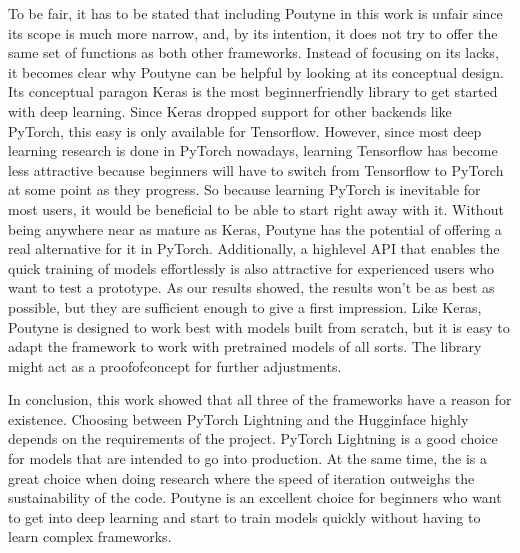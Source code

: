 \documentclass[letterpaper,10pt,english]{jupyterBook}
\begin{document}
\sphinxAtStartPar
To be fair, it has to be stated that including Poutyne in this work is unfair since its scope is much more narrow, and, by its intention, it does not try to offer the same set of functions as both other frameworks.
Instead of focusing on its lacks, it becomes clear why Poutyne can be helpful by looking at its conceptual design.
Its conceptual paragon Keras is the most beginner\sphinxhyphen{}friendly library to get started with deep learning.
Since Keras dropped support for other backends like PyTorch, this easy is only available for Tensorflow.
However, since most deep learning research is done in PyTorch nowadays, learning Tensorflow has become less attractive because beginners will have to switch from Tensorflow to PyTorch at some point as they progress.
So because learning PyTorch is inevitable for most users, it would be beneficial to be able to start right away with it.
Without being anywhere near as mature as Keras, Poutyne has the potential of offering a real alternative for it in PyTorch.
Additionally, a high\sphinxhyphen{}level API that enables the quick training of models effortlessly is also attractive for experienced users who want to test a prototype.
As our results showed, the results won’t be as best as possible, but they are sufficient enough to give a first impression.
Like Keras, Poutyne is designed to work best with models built from scratch, but it is easy to adapt the framework to work with pretrained models of all sorts.
The library  might act as a proof\sphinxhyphen{}of\sphinxhyphen{}concept for further adjustments.

\sphinxAtStartPar
In conclusion, this work showed that all three of the frameworks have a reason for existence. Choosing between PyTorch Lightning and the Hugginface  highly depends on the requirements of the project. PyTorch Lightning is a good choice for models that are intended to go into production. At the same time, the  is a great choice when doing research where the speed of iteration outweighs the sustainability of the code.
Poutyne is an excellent choice for beginners who want to get into deep learning and start to train models quickly without having to learn complex frameworks.

\sphinxAtStartPar
\end{document}
